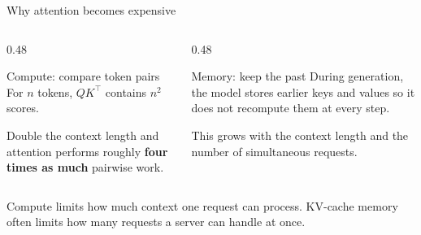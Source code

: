 \documentclass[aspectratio=169,10pt]{beamer}
\begin{document}
\begin{frame}{Why attention becomes expensive}
  \begin{columns}[T]
    \begin{column}{0.48\textwidth}
      \begin{block}{Compute: compare token pairs}
        For $n$ tokens, $QK^{\top}$ contains $n^2$ scores.
        \vspace{0.4em}

        Double the context length and attention performs roughly
        \textbf{four times as much} pairwise work.
      \end{block}
    \end{column}
    \begin{column}{0.48\textwidth}
      \begin{block}{Memory: keep the past}
        During generation, the model stores earlier keys and values so it
        does not recompute them at every step.
        \vspace{0.4em}

        This  grows with the context length and the number of
        simultaneous requests.
      \end{block}
    \end{column}
  \end{columns}
  \vfill
  \begin{takeaway}
    Compute limits how much context one request can process. KV-cache memory
    often limits how many requests a server can handle at once.
  \end{takeaway}
\end{frame}
\end{document}

